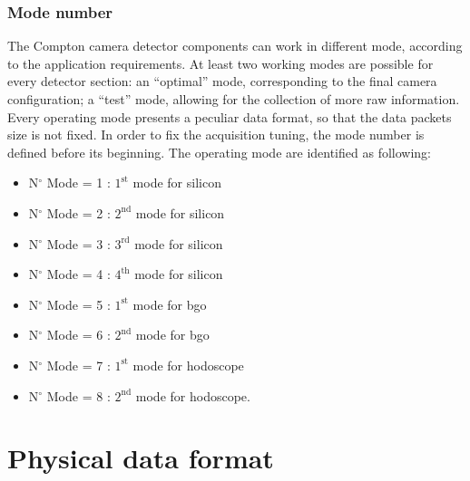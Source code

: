\subsubsection{Mode number}\label{chapappA::subsubsec::modeN}
The Compton camera detector components can work in different mode, according to the application requirements. At least two working modes are possible for every detector section: an \enquote{optimal} mode, corresponding to the final camera configuration; a \enquote{test} mode, allowing for the collection of more raw information. Every operating mode presents a peculiar data format, so that the data packets size is not fixed. In order to fix the acquisition tuning, the mode number is defined before its beginning.\newline
The operating mode are identified as following: \newline
\begin{itemize}
	\item N$^{\circ}$ Mode = 1 : $1^{\mathrm{st}}$ mode for silicon
	\item N$^{\circ}$ Mode = 2 : $2^{\mathrm{nd}}$ mode for silicon
	\item N$^{\circ}$ Mode = 3 : $3^{\mathrm{rd}}$ mode for silicon
	\item N$^{\circ}$ Mode = 4 : $4^{\mathrm{th}}$ mode for silicon
	\item N$^{\circ}$ Mode = 5 : $1^{\mathrm{st}}$ mode for \gls{bgo}
	\item N$^{\circ}$ Mode = 6 : $2^{\mathrm{nd}}$ mode for \gls{bgo}
	\item N$^{\circ}$ Mode = 7 : $1^{\mathrm{st}}$ mode for hodoscope
	\item N$^{\circ}$ Mode = 8 : $2^{\mathrm{nd}}$ mode for hodoscope.\newline
\end{itemize}



\section{Physical data format}\label{chapappA::sec::physDataFormat}


